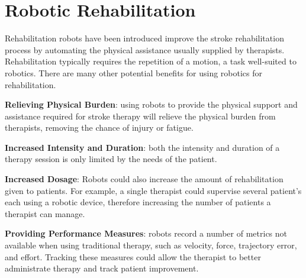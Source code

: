 \documentclass[12pt]{report}
\begin{document}




\section{Robotic Rehabilitation}

	Rehabilitation robots have been introduced improve the stroke rehabilitation process by automating the physical assistance usually supplied by therapists. Rehabilitation typically requires the repetition of a motion, a task well-suited to robotics. There are many other potential benefits for using robotics for rehabilitation.
	
	\textbf{Relieving Physical Burden}: using robots to provide the physical support and assistance required for stroke therapy will relieve the physical burden from therapists, removing the chance of injury or fatigue.
	
	\textbf{Increased Intensity and Duration}: both the intensity and duration of a therapy session is only limited by the needs of the patient. 
	
	\textbf{Increased Dosage}: Robots could also increase the amount of rehabilitation given to patients. For example, a single therapist could supervise several patient's each using a robotic device, therefore increasing the number of patients a therapist can manage.
	
	\textbf{Providing Performance Measures}: robots record a number of metrics not available when using traditional therapy, such as velocity, force, trajectory error, and effort. Tracking these measures could allow the therapist to better administrate therapy and track patient improvement. 
	
\end{document}
